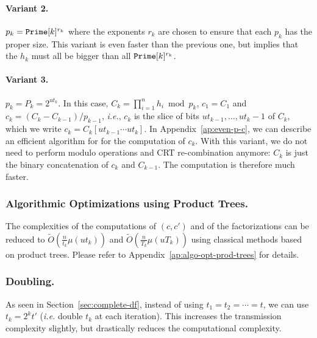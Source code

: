 \documentclass[twoside,envcountsame,runningheads]{llncs}
\newcommand{\Oapp}{\ensuremath{\tilde{O}}}
\newcommand{\ie}{\textit{i.e.}\xspace}
\newcommand{\apref}[1]{Appendix~\ref{#1}}
\newcommand{\apref}[1]{the full version~TODO}
\begin{document}
\paragraph{Variant 2.} $p_k=\mbox{{\tt Prime}}[k]^{r_k}$ where the exponents $r_k$ are chosen to ensure that each $p_k$ has the proper size.
This variant is even faster than the previous one, but implies that the $h_k$ must all be bigger than all
$\mbox{{\tt Prime}}[k]^{r_k}$.

\paragraph{Variant 3.} $p_k = P_k = 2^{ut_k}$. 
In this case, $C_k = \prod_{i=1}^n h_i \bmod p_k$, $c_1 = C_1$ and $c_k = (C_k - C_{k-1}) / p_{k-1}$, {\it i.e.}, $c_k$ is the slice of bits $ut_{k-1}, \dots, ut_k-1$ of $C_k$, which we write $c_k = C_k[ut_{k-1}\cdots ut_k]$.
In \apref{ap:even-p-c}, we can describe an efficient algorithm for for the computation of $c_k$. 
With this variant, we do not need to perform modulo operations and CRT re-combination anymore: $C_k$ is just the binary concatenation of $c_k$ and $C_{k-1}$. The computation is therefore much faster.


\subsubsection{Algorithmic Optimizations using Product Trees.}
\label{sec:algo-opt-prod-trees}

The complexities of the computations of $(c,c')$ and of the factorizations can be reduced to $\Oapp(\frac{n}{t_k} \mu(u t_k))$ and $\Oapp(\frac{n}{T_k} \mu(u T_k))$ using classical methods based on product trees. 
Please refer to \apref{ap:algo-opt-prod-trees} for details.

\subsubsection{Doubling.}
\label{sec:doubling}

As seen in Section~\ref{sec:complete-df}, instead of using $t_1 = t_2 = \cdots = t$, we can use $t_k = 2^k t'$ (\ie double $t_k$ at each iteration).
This increases the transmission complexity slightly, but drastically reduces the computational complexity.
\end{document}
